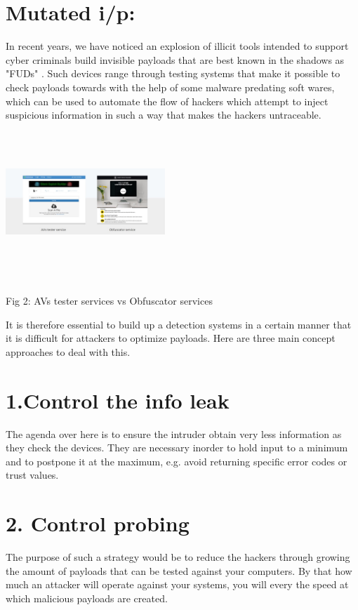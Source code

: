 \documentclass[journal,twoside,web]{ieeecolor}
\begin{document}
\section{Mutated i/p:}
In recent years, we have noticed an explosion of illicit tools intended to support cyber criminals build invisible payloads that are best known in the shadows as "FUDs" . Such devices range through testing systems that make it possible to check payloads towards with the help of some malware predating soft wares, which can be used to automate the flow of hackers which attempt to inject suspicious information in such a way that makes the hackers untraceable. \\

\newline
\includegraphics[width=0.45\textwidth,height=6cm]{pictures/2..png}
\begin{center}
Fig 2: AVs tester services vs Obfuscator services
\end{center}

It is therefore essential to build up a detection systems in a certain manner that it is difficult for attackers to optimize payloads. Here are three main concept approaches to deal with this.
\section{1.Control the info leak}
The agenda over here is to ensure the intruder obtain very less information as they check the devices. They are necessary inorder to hold input to a minimum and to postpone it at the maximum, e.g. avoid returning specific error codes or trust values.
\section{2. Control probing}
The purpose of such a strategy would be to reduce the  hackers through growing the amount of payloads that can be tested against your computers. By that how much an attacker will operate against your systems, you will every the speed at which malicious payloads are created.\\
\end{document}

